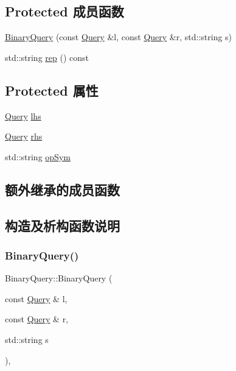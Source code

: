 \subsection*{Protected 成员函数}
\begin{DoxyCompactItemize}
\item 
\hyperlink{classBinaryQuery_aaa682971fc9991f977baf718f7697979}{Binary\+Query} (const \hyperlink{classQuery}{Query} \&l, const \hyperlink{classQuery}{Query} \&r, std\+::string s)
\item 
std\+::string \hyperlink{classBinaryQuery_ad464dd807f5b48025a48355f73b34fcd}{rep} () const
\end{DoxyCompactItemize}
\subsection*{Protected 属性}
\begin{DoxyCompactItemize}
\item 
\hyperlink{classQuery}{Query} \hyperlink{classBinaryQuery_ae1d69c3225f9ac3e16c6bb3dd59b0f07}{lhs}
\item 
\hyperlink{classQuery}{Query} \hyperlink{classBinaryQuery_a22e8a3a081421a2ea2106aa5b0541773}{rhs}
\item 
std\+::string \hyperlink{classBinaryQuery_a773bb87bb747ca84ef24af6827196271}{op\+Sym}
\end{DoxyCompactItemize}
\subsection*{额外继承的成员函数}


\subsection{构造及析构函数说明}
\mbox{\label{classBinaryQuery_aaa682971fc9991f977baf718f7697979}} 
\subsubsection{\texorpdfstring{Binary\+Query()}{BinaryQuery()}}
{\footnotesize\ttfamily Binary\+Query\+::\+Binary\+Query (\begin{DoxyParamCaption}\item[{const \hyperlink{classQuery}{Query} \&}]{l,  }\item[{const \hyperlink{classQuery}{Query} \&}]{r,  }\item[{std\+::string}]{s }\end{DoxyParamCaption})\hspace{0.3cm}{\ttfamily [inline]}, {\ttfamily [protected]}}



